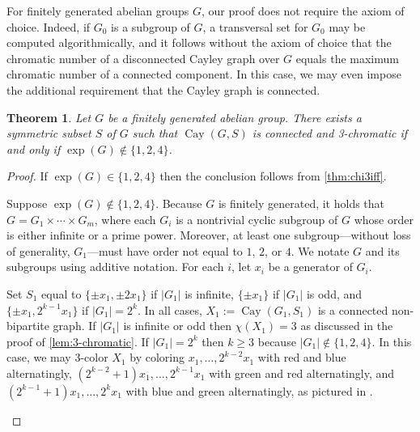 \documentclass[12pt,letterpaper]{amsart}
\newtheorem{theorem}{Theorem}[section]
\theoremstyle{definition}
\theoremstyle{remark}
\DeclareMathOperator{\Cay}{Cay}
\begin{document}
For finitely generated abelian groups $G$, our proof does not require the axiom of choice. Indeed, if $G_0$ is a subgroup of $G$, a transversal set for $G_0$ may be computed algorithmically, and it follows without the axiom of choice that the chromatic number of a disconnected Cayley graph over $G$ equals the maximum chromatic number of a connected component.  In this case, we may even impose the additional requirement that the Cayley graph is connected.

\begin{theorem}\label{thm:connected-Cayley}
    Let $G$ be a finitely generated abelian group. There exists a symmetric subset $S$ of $G$ such that $\Cay(G,S)$ is connected and 3-chromatic if and only if $\exp(G)\notin\{1,2,4\}$.
\end{theorem}

\begin{proof}
If $\exp(G)\in\{1,2,4\}$ then the conclusion follows from \cref{thm:chi3iff}.

Suppose  $\exp(G)\notin\{1,2,4\}$. Because $G$ is finitely generated, it holds that $G=G_1\times\cdots\times G_m$, where each $G_i$ is a nontrivial cyclic subgroup of $G$ whose order is either infinite or a prime power. Moreover, at least one subgroup---without loss of generality, $G_1$---must have order not equal to $1$, $2$, or $4$. We notate $G$ and its subgroups using additive notation. For each $i$, let $x_i$ be a generator of $G_i$.

Set $S_1$ equal to $\{\pm x_1,\pm 2x_1\}$ if $|G_1|$ is infinite, $\{\pm x_1\}$ if $|G_1|$ is odd, and $\{\pm x_1, 2^{k-1}x_1\}$ if $|G_1|=2^k$. In all cases, $X_1:=\Cay(G_1,S_1)$ is a connected non-bipartite graph. If $|G_1|$ is infinite or odd then $\chi(X_1)=3$ as discussed in the proof of \cref{lem:3-chromatic}. If $|G_1|=2^k$ then $k\geq 3$ because $|G_1|\notin\{1,2,4\}$. In this case, we may 3-color $X_1$ by coloring $x_1,\ldots,2^{k-2}x_1$ with red and blue alternatingly, $(2^{k-2}+1)x_1,\ldots,2^{k-1}x_1$ with green and red alternatingly, and $(2^{k-1}+1)x_1,\ldots,2^kx_1$ with blue and green alternatingly, as pictured in .
\begin{figure}[h]
\begin{tikzpicture}[rotate=45,scale=1.2,
	a/.style={vtx,draw=black,fill=red},
	b/.style={vtx,draw=black,fill=blue},
	c/.style={vtx,draw=black,fill=prettygreen}]


\end{tikzpicture}
\end{figure}
\end{proof}
\end{document}
